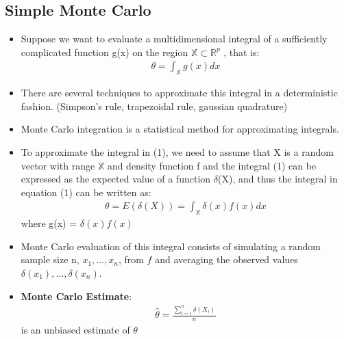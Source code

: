 \documentclass[12pt, oneside]{article}
\begin{document}
\subsection{Simple Monte Carlo}
\begin{itemize}
    \item Suppose we want to evaluate a multidimensional integral of a sufficiently complicated function g(x) on the region $\mathbb{X} \subset \mathbb{R}^p$ , that is:
    \begin{align}
        \theta = \int_\mathbb{X} g(x)dx
    \end{align}
    \item There are several techniques to approximate this integral in a deterministic fashion. (Simpson's rule, trapezoidal rule, gaussian quadrature)
    \item Monte Carlo integration is a statistical method for approximating integrals.
    \item To approximate the integral in (1), we need to assume that X is a random vector with range $\mathbb{X}$ and density function f and the integral (1) can be expressed as the expected value of a function $\delta$(X), and thus the integral in equation (1) can be written as:
    \begin{align*}
        \theta = E(\delta(X)) = \int_\mathbb{X} \delta(x)f(x)dx
    \end{align*}
    where g(x) = $\delta(x)f(x)$
    \item Monte Carlo evaluation of this integral consists of simulating a random sample size n, $x_1,...,x_n$, from $f$ and averaging the observed values $\delta(x_1),...,\delta(x_n)$.
    \item \textbf{Monte Carlo Estimate}:
    \begin{align*}
        \widehat{\theta} = \frac{\sum^n_{i=1}\delta(X_i)}{n} 
    \end{align*}
    is an unbiased estimate of $\theta$
\end{itemize}
\end{document}
